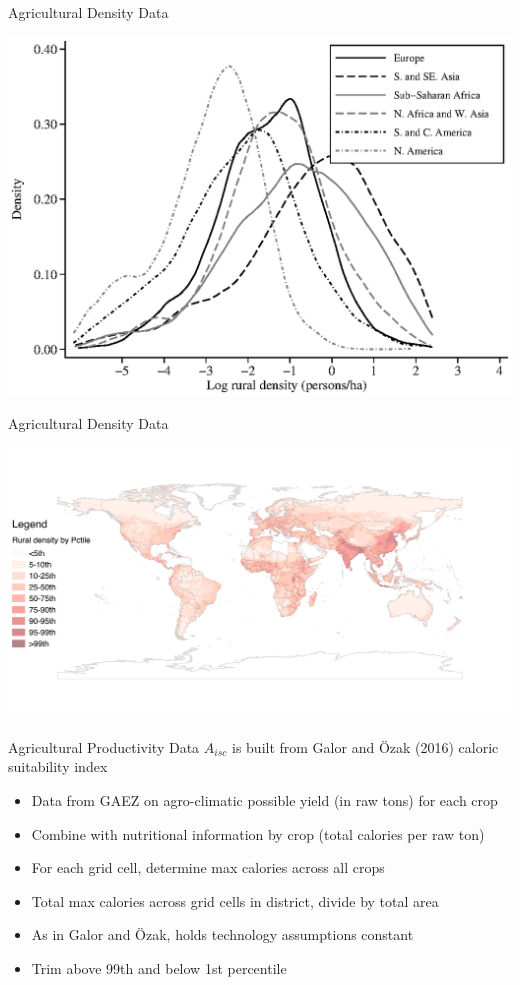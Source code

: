 \documentclass[10pt, xcolor=dvipsnames]{beamer}
\begin{document}
\begin{frame}{Agricultural Density Data}
\begin{center}
\includegraphics[width=.8\textwidth]{fig_dens_rurd.eps}
\end{center}
\end{frame}

\begin{frame}{Agricultural Density Data}
\begin{center}
\includegraphics[scale=.5]{fig_rurd_map.png}
\end{center}
\end{frame}

\begin{frame}{Agricultural Productivity Data}\label{data}
$A_{isc}$ is built from Galor and {\"O}zak (2016) caloric suitability index
\begin{itemize}
  \item Data from GAEZ on agro-climatic possible yield (in raw tons) for each crop
  \item Combine with nutritional information by crop (total calories per raw ton)
  \item For each grid cell, determine max calories across all crops
  \item Total max calories across grid cells in district, divide by total area
  \item As in Galor and {\"O}zak, holds technology assumptions constant
  \item Trim above 99th and below 1st percentile
\end{itemize}
\hfill \hyperlink{stats}{}

\hfill \hyperlink{crops}{}
\end{frame}
\end{document}
